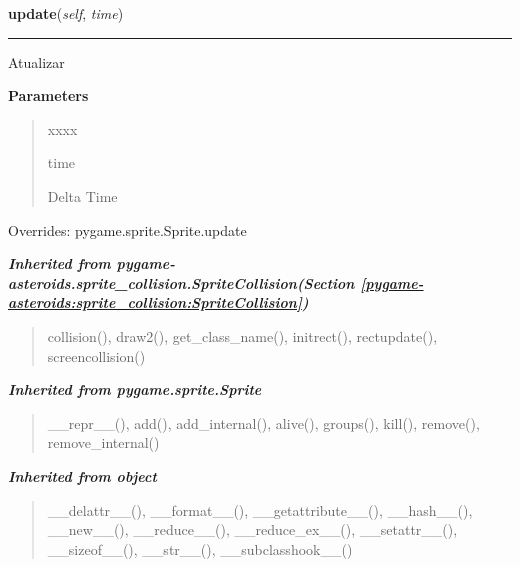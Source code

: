     \vspace{0.5ex}

\hspace{.8\funcindent}\begin{boxedminipage}{\funcwidth}

    \raggedright \textbf{update}(\textit{self}, \textit{time})

    \vspace{-1.5ex}

    \rule{\textwidth}{0.5\fboxrule}
\setlength{\parskip}{2ex}
    Atualizar

\setlength{\parskip}{1ex}
      \textbf{Parameters}
      \vspace{-1ex}

      \begin{quote}
        \begin{Ventry}{xxxx}

          \item[time]

          Delta Time

        \end{Ventry}

      \end{quote}

      Overrides: pygame.sprite.Sprite.update

    \end{boxedminipage}


\large{\textbf{\textit{Inherited from pygame-asteroids.sprite\_collision.SpriteCollision\textit{(Section \ref{pygame-asteroids:sprite_collision:SpriteCollision})}}}}

\begin{quote}
collision(), draw2(), get\_class\_name(), initrect(), rectupdate(), screencollision()
\end{quote}

\large{\textbf{\textit{Inherited from pygame.sprite.Sprite}}}

\begin{quote}
\_\_repr\_\_(), add(), add\_internal(), alive(), groups(), kill(), remove(), remove\_internal()
\end{quote}

\large{\textbf{\textit{Inherited from object}}}

\begin{quote}
\_\_delattr\_\_(), \_\_format\_\_(), \_\_getattribute\_\_(), \_\_hash\_\_(), \_\_new\_\_(), \_\_reduce\_\_(), \_\_reduce\_ex\_\_(), \_\_setattr\_\_(), \_\_sizeof\_\_(), \_\_str\_\_(), \_\_subclasshook\_\_()
\end{quote}

